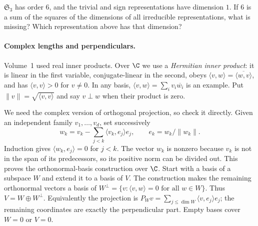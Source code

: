 \begin{think}
$\mathfrak S_3$ has order $6$, and the trivial and sign representations have dimension $1$. If $6$ is a sum of the squares of the dimensions of all irreducible representations, what is missing? Which representation above has that dimension?
\end{think}

\paragraph{Complex lengths and perpendiculars.}
Volume~1 used real inner products. Over $\C$ we use a \emph{Hermitian inner
product}: it is linear in the first variable, conjugate-linear in the second,
obeys $\langle v,w\rangle=\overline{\langle w,v\rangle}$, and has
$\langle v,v\rangle>0$ for $v\ne0$. In any basis,
$\langle v,w\rangle=\sum_i v_i\overline{w_i}$ is an example. Put
$\|v\|=\sqrt{\langle v,v\rangle}$ and say $v\perp w$ when their product is zero.

We need the complex version of orthogonal projection, so check it directly.
Given an independent family $v_1,\ldots,v_d$, set successively
\[
w_k=v_k-\sum_{j<k}\langle v_k,e_j\rangle e_j,
\qquad e_k=w_k/\|w_k\|.
\]
Induction gives $\langle w_k,e_j\rangle=0$ for $j<k$.
The vector $w_k$ is nonzero because $v_k$ is not in the span of its
predecessors, so its positive norm can be divided out. This proves the
orthonormal-basis construction over $\C$. Start with a basis of a subspace
$W$ and extend it to a basis of $V$. The construction makes the remaining
orthonormal vectors a basis of
$W^\perp=\{v:\langle v,w\rangle=0\text{ for all }w\in W\}$.
Thus $V=W\oplus W^\perp$. Equivalently the projection is
$P_Wv=\sum_{j\le\dim W}\langle v,e_j\rangle e_j$; the remaining coordinates
are exactly the perpendicular part. Empty bases cover $W=0$ or $V=0$.


